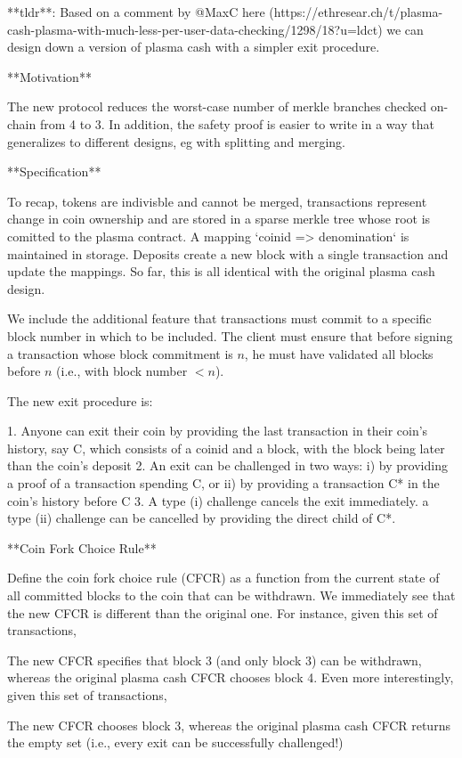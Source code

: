 \documentclass{article}
\begin{document}
**tldr**: Based on a comment by @MaxC here (https://ethresear.ch/t/plasma-cash-plasma-with-much-less-per-user-data-checking/1298/18?u=ldct) we can design down a version of plasma cash with a simpler exit procedure.

**Motivation**

The new protocol reduces the worst-case number of merkle branches checked on-chain from 4 to 3. In addition, the safety proof is easier to write in a way that generalizes to different designs, eg with splitting and merging.

**Specification**

To recap, tokens are indivisble and cannot be merged, transactions represent change in coin ownership and are stored in a sparse merkle tree whose root is comitted to the plasma contract. A mapping `coinid => denomination` is maintained in storage. Deposits create a new block with a single transaction and update the mappings. So far, this is all identical with the original plasma cash design.

We include the additional feature that transactions must commit to a specific block number in which to be included. The client must ensure that before signing a transaction whose block commitment is $n$, he must have validated all blocks before $n$ (i.e., with block number $< n$).

The new exit procedure is:

1. Anyone can exit their coin by providing the last transaction in their coin's history, say C, which consists of a coinid and a block, with the block being later than the coin's deposit
2. An exit can be challenged in two ways: i) by providing a proof of a transaction spending C, or ii) by providing a transaction C* in the coin's history before C
3. A type (i) challenge cancels the exit immediately. a type (ii) challenge can be cancelled by providing the direct child of C*.

**Coin Fork Choice Rule**

Define the coin fork choice rule (CFCR) as a function from the current state of all committed blocks to the coin that can be withdrawn. We immediately see that the new CFCR is different than the original one. For instance, given this set of transactions,

The new CFCR specifies that block 3 (and only block 3) can be withdrawn, whereas the original plasma cash CFCR chooses block 4. Even more interestingly, given this set of transactions,

The new CFCR chooses block 3, whereas the original plasma cash CFCR returns the empty set (i.e., every exit can be successfully challenged!)
\end{document}
